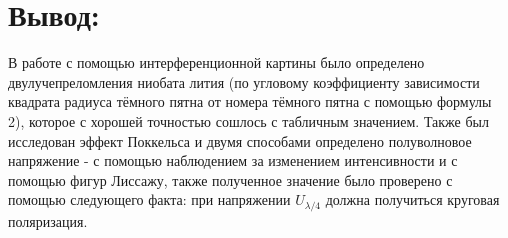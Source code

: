\documentclass[a4paper,12pt]{article}
\begin{document}
\section{Вывод:}
В работе с помощью интерференционной картины было определено двулучепреломления ниобата лития (по угловому коэффициенту зависимости квадрата радиуса тёмного пятна от номера тёмного пятна с помощью формулы 2), которое с хорошей точностью сошлось с табличным значением.
Также был исследован эффект Поккельса и двумя способами определено полуволновое напряжение - с помощью наблюдением за изменением интенсивности и с помощью фигур Лиссажу, также полученное значение было проверено с помощью следующего факта: при напряжении $U_{\lambda/4}$ должна получиться круговая поляризация.





\end{document}
